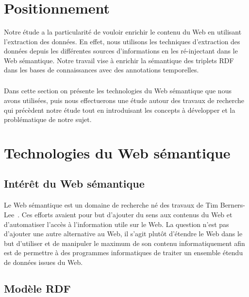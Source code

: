 \section{Positionnement}
\paragraph{}
Notre étude a la particularité de vouloir enrichir le contenu du Web en utilisant l'extraction des données. 
En effet, nous utilisons les techniques d'extraction des données depuis les différentes sources d'informations en les ré-injectant dans le Web sémantique. Notre travail vise à enrichir la sémantique des triplets RDF dans les bases de connaissances avec des annotations temporelles.
\subparagraph{}
Dans cette section on présente les technologies du Web sémantique que nous avons utilisées, puis nous effectuerons une étude autour des travaux de recherche qui précèdent notre étude tout en introduisant les concepts à développer et la problématique de notre sujet.
\section{Technologies du Web sémantique}
\subsection{Intérêt du Web sémantique}
\paragraph{}
Le Web sémantique est un domaine de recherche né des travaux de Tim Berners-Lee~\cite{Berners-lee2001}. Ces efforts avaient pour but d'ajouter du sens aux contenus du Web et d'automatiser l'accès à l'information utile sur le Web. La question n’est pas d'ajouter une autre alternative au Web, il s’agit plutôt d'étendre le Web dans le but d'utiliser et de manipuler le maximum de son contenu informatiquement afin est de permettre à des programmes informatiques de traiter un ensemble étendu de données issues du Web.
\subsection{Modèle RDF}
